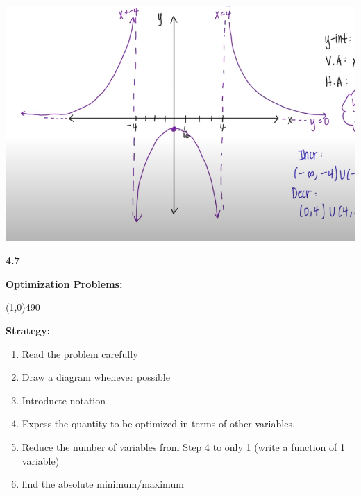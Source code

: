 \documentclass{report}
\begin{document}
  \bigbreak \noindent 
  \begin{center}
    \includegraphics[scale=0.7]{ ./images/20.png }
  \end{center}

  \pagebreak \bigbreak \noindent
  \begin{Large}
      \begin{mdframed}
          \begin{center}
              \textbf{4.7}
          \end{center}
      \end{mdframed}
  \end{Large}
  \begin{Large}
      \begin{center}
          \textbf{Optimization Problems:}
      \end{center}
  \end{Large}
  \line(1,0){490}
  
  \bigbreak \noindent 
  \begin{mdframed}
    \textbf{Strategy:}
    \begin{enumerate}
      \item Read the problem carefully
      \item Draw a diagram whenever possible 
      \item Introducte notation
      \item Expess the quantity to be optimized in terms of other variables.
      \item Reduce the number of variables from Step 4 to only 1 (write a function of 1 variable)
      \item find the absolute minimum/maximum
    \end{enumerate}
  \end{mdframed}
\end{document}
